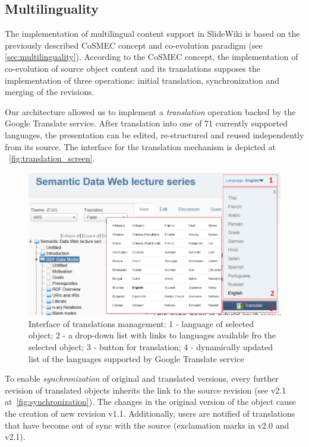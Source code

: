 \documentclass[ngerman,UKenglish,table]{scrbook}
\begin{document}
\subsection{Multilinguality}
\label{sec:multilinguality_impl}

The implementation of multilingual content support in SlideWiki is based on the previously described CoSMEC concept and co-evolution paradigm (see \autoref{sec:multilinguality}).
According to the CoSMEC concept, the implementation of co-evolution of source object content and its translations supposes the implementation of three operations: initial translation, synchronization and merging of the revisions.

Our architecture allowed us to implement a \emph{translation} operation backed by the Google Translate service.
After translation into one of 71 currently supported languages, the presentation can be edited, re-structured and reused independently from its source.
The interface for the translation mechanism is depicted at ~\autoref{fig:translation_screen}.

\begin{figure}[!htb]
	\centering
		\includegraphics[width=\textwidth]{Images/translation_screen.png}
	\caption{Interface of translations management: 1 - language of selected object; 2 - a drop-down list with links to languages available fro the selected object; 3 - button for translation; 4 - dynamically updated list of the languages supported by Google Translate service}
	\label{fig:translation_screen}
\end{figure}

To enable \emph{synchronization} of original and translated versions, every further revision of translated objects inherits the link to the source revision (see v2.1 at~\autoref{fig:synchronization}).
The changes in the original version of the object cause the creation of new revision v1.1.
Additionally, users are notified of translations that have become out of sync with the source (exclamation marks in v2.0 and v2.1).
\end{document}

